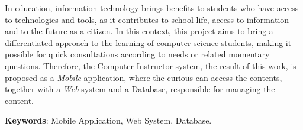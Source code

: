 %
%

\begin{ABSTRACT}
	\begin{SingleSpace}
				
		\hspace{-1.5cm}
		In education, information technology brings benefits to students who have access to technologies and tools, as it contributes to school life, access to information and to the future as a citizen. In this context, this project aims to bring a differentiated approach to the learning of computer science students, making it possible for quick consultations according to needs or related momentary questions. Therefore, the Computer Instructor system, the result of this work, is proposed as a \textit{Mobile} application, where the curious can access the contents, together with a \textit{Web} system and a Database, responsible for managing the content.
		
		\vspace*{0.5cm}\hspace{-1.5 cm}\textbf{Keywords}: Mobile Application, Web System, Database.
				
	\end{SingleSpace}
	
\end{ABSTRACT}
